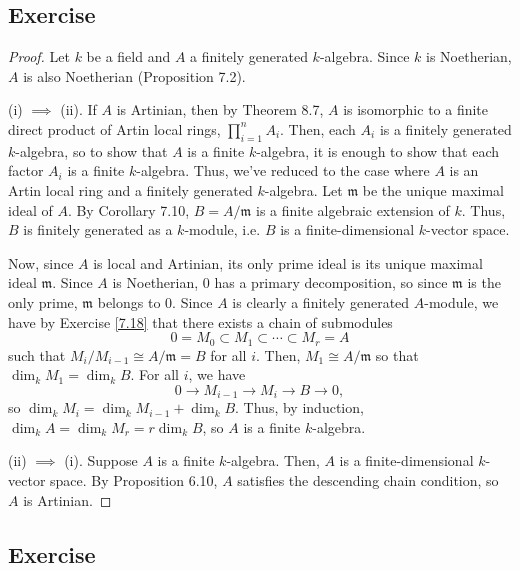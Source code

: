 \subsection{Exercise}\label{8.3}

\begin{proof}
Let $k$ be a field and $A$ a finitely generated $k$-algebra. Since $k$ is Noetherian, $A$ is also Noetherian (Proposition 7.2).

(i) $\implies$ (ii). If $A$ is Artinian, then by Theorem 8.7, $A$ is isomorphic to a finite direct product of Artin local rings, $\prod_{i=1}^n A_i$.
Then, each $A_i$ is a finitely generated $k$-algebra, so to show that $A$ is a finite $k$-algebra, it is enough to show that each factor $A_i$ is a 
finite $k$-algebra. Thus, we've reduced to the case where $A$ is an Artin local ring and a finitely generated $k$-algebra. Let $\mathfrak{m}$ be the
unique maximal ideal of $A$. By Corollary 7.10, $B = A/\mathfrak{m}$ is a finite algebraic extension of $k$. Thus, $B$ is finitely generated as a $k$-module, 
i.e. $B$ is a finite-dimensional $k$-vector space.

Now, since $A$ is local and Artinian, its only prime ideal is its unique maximal ideal $\mathfrak{m}$. Since $A$ is Noetherian, $0$ has a primary decomposition, 
so since $\mathfrak{m}$ is the only prime, $\mathfrak{m}$ belongs to $0$. Since $A$ is clearly a finitely generated $A$-module, we have by Exercise \ref{7.18} that
there exists a chain of submodules
$$0 = M_0 \subset M_1 \subset \cdots \subset M_r = A$$
such that $M_i/M_{i-1} \cong A/\mathfrak{m} = B$ for all $i$. Then, $M_1 \cong A/\mathfrak{m}$ so that $\dim_k M_1 = \dim_k B$. For all $i$, we have
$$0 \to M_{i-1} \to M_i \to B \to 0,$$
so $\dim_k M_i = \dim_k M_{i-1} + \dim_k B$. Thus, by induction, $\dim_k A = \dim_k M_r = r \dim_k B$, so $A$ is a finite $k$-algebra.

(ii) $\implies$ (i). Suppose $A$ is a finite $k$-algebra. Then, $A$ is a finite-dimensional $k$-vector space. By Proposition 6.10, $A$ satisfies the
descending chain condition, so $A$ is Artinian.
\end{proof}

\subsection{Exercise}\label{8.4}


